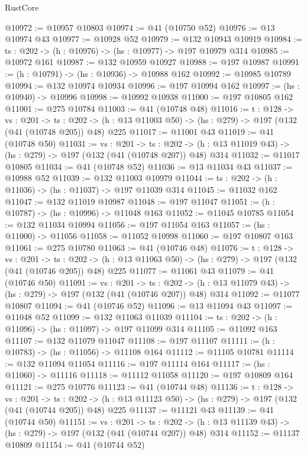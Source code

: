 \begin{lexlean}{RustCore}
\begin{coremodule}
@10972 := @10957 @10803
@10974 := @41 (@10750 @52)
@10976 := @13 @10974 @43
@10977 := @10928 @52
@10979 := @132 @10943 @10919
@10984 := {ts : @202} -> (h : @10976) -> (hs : @10977) -> @197 @10979 @314
@10985 := @10972 @161
@10987 := @132 @10959 @10927
@10988 := @197 @10987
@10991 := (h : @10791) -> (hs : @10936) -> @10988 @162
@10992 := @10985 @10789
@10994 := @132 @10974 @10934
@10996 := @197 @10994 @162
@10997 := (hs : @10940) -> @10996
@10998 := @10992 @10938
@11000 := @197 @10805 @162
@11001 := @275 @10784
@11003 := @41 (@10748 @48)
@11016 := {t : @128} ->
  {vs : @201} ->
  {ts : @202} -> (h : @13 @11003 @50) -> (hs : @279) -> @197 (@132 (@41 (@10748 @205)) @48) @225
@11017 := @11001 @43
@11019 := @41 (@10748 @50)
@11031 := {vs : @201} ->
  {ts : @202} -> (h : @13 @11019 @43) -> (hs : @279) -> @197 (@132 (@41 (@10748 @207)) @48) @314
@11032 := @11017 @10805
@11034 := @41 (@10748 @52)
@11036 := @13 @11034 @43
@11037 := @10988 @52
@11039 := @132 @11003 @10979
@11044 := {ts : @202} -> (h : @11036) -> (hs : @11037) -> @197 @11039 @314
@11045 := @11032 @162
@11047 := @132 @11019 @10987
@11048 := @197 @11047
@11051 := (h : @10787) -> (hs : @10996) -> @11048 @163
@11052 := @11045 @10785
@11054 := @132 @11034 @10994
@11056 := @197 @11054 @163
@11057 := (hs : @11000) -> @11056
@11058 := @11052 @10998
@11060 := @197 @10807 @163
@11061 := @275 @10780
@11063 := @41 (@10746 @48)
@11076 := {t : @128} ->
  {vs : @201} ->
  {ts : @202} -> (h : @13 @11063 @50) -> (hs : @279) -> @197 (@132 (@41 (@10746 @205)) @48) @225
@11077 := @11061 @43
@11079 := @41 (@10746 @50)
@11091 := {vs : @201} ->
  {ts : @202} -> (h : @13 @11079 @43) -> (hs : @279) -> @197 (@132 (@41 (@10746 @207)) @48) @314
@11092 := @11077 @10807
@11094 := @41 (@10746 @52)
@11096 := @13 @11094 @43
@11097 := @11048 @52
@11099 := @132 @11063 @11039
@11104 := {ts : @202} -> (h : @11096) -> (hs : @11097) -> @197 @11099 @314
@11105 := @11092 @163
@11107 := @132 @11079 @11047
@11108 := @197 @11107
@11111 := (h : @10783) -> (hs : @11056) -> @11108 @164
@11112 := @11105 @10781
@11114 := @132 @11094 @11054
@11116 := @197 @11114 @164
@11117 := (hs : @11060) -> @11116
@11118 := @11112 @11058
@11120 := @197 @10809 @164
@11121 := @275 @10776
@11123 := @41 (@10744 @48)
@11136 := {t : @128} ->
  {vs : @201} ->
  {ts : @202} -> (h : @13 @11123 @50) -> (hs : @279) -> @197 (@132 (@41 (@10744 @205)) @48) @225
@11137 := @11121 @43
@11139 := @41 (@10744 @50)
@11151 := {vs : @201} ->
  {ts : @202} -> (h : @13 @11139 @43) -> (hs : @279) -> @197 (@132 (@41 (@10744 @207)) @48) @314
@11152 := @11137 @10809
@11154 := @41 (@10744 @52)

\end{coremodule}
\end{lexlean}
